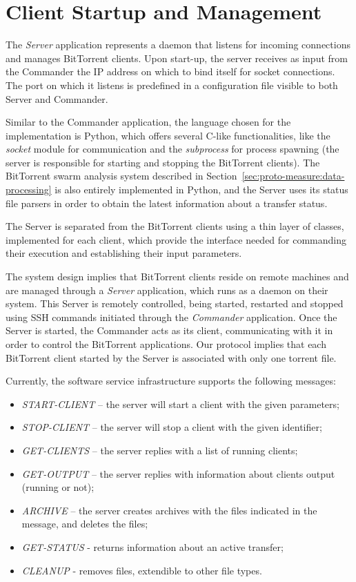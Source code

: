 \section{Client Startup and Management}
\label{sec:deploy-startup}

The \textit{Server} application represents a daemon that listens for incoming
connections and manages BitTorrent clients. Upon start-up, the server receives
as input from the Commander the IP address on which to bind itself for socket
connections. The port on which it listens is predefined in a configuration
file visible to both Server and Commander.

Similar to the Commander application, the language chosen for the
implementation is Python, which offers several C-like functionalities, like
the \textit{socket} module for communication and the \textit{subprocess} for
process spawning (the server is responsible for starting and stopping the
BitTorrent clients). The BitTorrent swarm analysis system described in
Section~\ref{sec:proto-measure:data-processing} is also entirely implemented
in Python, and the Server uses its status file parsers in order to obtain the
latest information about a transfer status.

The Server is separated from the BitTorrent clients using a thin layer of
classes, implemented for each client, which provide the interface needed for
commanding their execution and establishing their input parameters.

The system design implies that BitTorrent clients reside on remote machines
and are managed through a \textit{Server} application, which runs as a daemon
on their system. This Server is remotely controlled, being started, restarted
and stopped using SSH commands initiated through the \textit{Commander}
application. Once the Server is started, the Commander acts as its client,
communicating with it in order to control the BitTorrent applications. Our
protocol implies that each BitTorrent client started by the Server is
associated with only one torrent file.

Currently, the software service infrastructure supports the following messages:
\begin{itemize}
  \item \textit{START-CLIENT} -- the server will start a client with the given
  parameters;
  \item \textit{STOP-CLIENT} -- the server will stop a client with the given
  identifier;
  \item \textit{GET-CLIENTS} -- the server replies with a list of running
  clients;
  \item \textit{GET-OUTPUT} -- the server replies with information about
  clients output (running or not);
  \item \textit{ARCHIVE } -- the server creates archives with the files
  indicated in the message, and deletes the files;
  \item \textit{GET-STATUS} - returns information about an active transfer;
  \item \textit{CLEANUP} - removes files, extendible to other file types.
\end{itemize}

